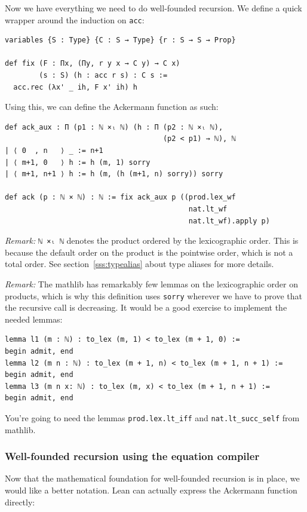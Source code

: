 \documentclass[a4paper, 12pt]{article}
\newcommand{\lean}[1]{\texttt{#1}}
\theoremstyle{changedot}
\theoremstyle{changedotbreak}
\theoremstyle{nonumberplain}
\begin{document}
Now we have everything we need to do well-founded recursion. We define a quick wrapper around the induction on \lean{acc}:

\begin{verbatim}
variables {S : Type} {C : S → Type} {r : S → S → Prop}

def fix (F : Πx, (Πy, r y x → C y) → C x)
        (s : S) (h : acc r s) : C s :=
  acc.rec (λx' _ ih, F x' ih) h
\end{verbatim}

Using this, we can define the Ackermann function as such:

\begin{verbatim}
def ack_aux : Π (p1 : ℕ ×ₗ ℕ) (h : Π (p2 : ℕ ×ₗ ℕ),
                                     (p2 < p1) → ℕ), ℕ
| ⟨ 0  , n   ⟩ _ := n+1
| ⟨ m+1, 0   ⟩ h := h (m, 1) sorry
| ⟨ m+1, n+1 ⟩ h := h (m, (h (m+1, n) sorry)) sorry

def ack (p : ℕ × ℕ) : ℕ := fix ack_aux p ((prod.lex_wf
                                           nat.lt_wf
                                           nat.lt_wf).apply p)
\end{verbatim}

\textit{Remark:} \lean{ℕ ×ₗ ℕ} denotes the product ordered by the lexicographic order. This is because the default order on the product is the pointwise order, which is not a total order. See section~\ref{sss:typealias} about type aliases for more details.

\textit{Remark:} The mathlib has remarkably few lemmas on the lexicographic order on products, which is why this definition uses \lean{sorry} wherever we have to prove that the recursive call is decreasing. It would be a good exercise to implement the needed lemmas:

\begin{verbatim}
lemma l1 (m : ℕ) : to_lex (m, 1) < to_lex (m + 1, 0) :=
begin admit, end
lemma l2 (m n : ℕ) : to_lex (m + 1, n) < to_lex (m + 1, n + 1) :=
begin admit, end
lemma l3 (m n x: ℕ) : to_lex (m, x) < to_lex (m + 1, n + 1) :=
begin admit, end
\end{verbatim}

You're going to need the lemmas \lean{prod.lex.lt_iff} and \lean{nat.lt_succ_self} from mathlib.

\subsubsection{Well-founded recursion using the equation compiler}
Now that the mathematical foundation for well-founded recursion is in place, we would like a better notation. Lean can actually express the Ackermann function directly:
\end{document}
